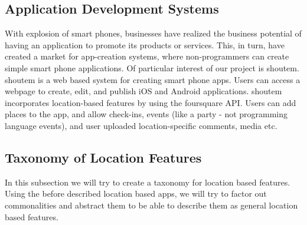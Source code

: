 \subsection{Application Development Systems} %
\label{sub:application_development_systems}
With explosion of smart phones, businesses have realized the business potential of having an application to promote its products or services. This, in turn, have created a market for app-creation systems, where non-programmers can create simple smart phone applications. Of particular interest of our project is shoutem. shoutem is a web based system for creating smart phone apps. Users can access a webpage to create, edit, and publish iOS and Android applications. shoutem incorporates location-based features by using the foursquare API. Users can add places to the app, and allow check-ins, events (like a party - not programming language events), and user uploaded location-specific comments, media etc. 

\subsection{Taxonomy of Location Features} %
\label{sub:taxanomy_of_location_features}
In this subsection we will try to create a taxonomy for location based features. Using the before described location based apps, we will try to factor out commonalities and abstract them to be able to describe them as general location based features.
